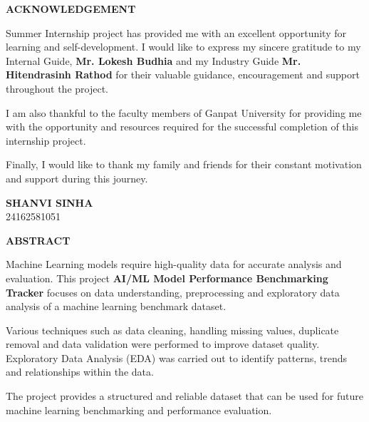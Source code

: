 \documentclass[12pt,a4paper]{report}
\begin{document}

\begin{center}
\textbf{\Large ACKNOWLEDGEMENT}
\end{center}

\vspace{1cm}

Summer Internship project has provided me with an excellent opportunity for learning and self-development. I would like to express my sincere gratitude to my Internal Guide, \textbf{Mr. Lokesh Budhia} and my Industry Guide \textbf{Mr. Hitendrasinh Rathod} for their valuable guidance, encouragement and support throughout the project.

I am also thankful to the faculty members of Ganpat University for providing me with the opportunity and resources required for the successful completion of this internship project.

Finally, I would like to thank my family and friends for their constant motivation and support during this journey.

\vspace{1cm}

\begin{flushleft}
\textbf{SHANVI SINHA}\\
24162581051
\end{flushleft}

\newpage


\begin{center}
\textbf{\Large ABSTRACT}
\end{center}

\vspace{1cm}

Machine Learning models require high-quality data for accurate analysis and evaluation. This project \textbf{AI/ML Model Performance Benchmarking Tracker} focuses on data understanding, preprocessing and exploratory data analysis of a machine learning benchmark dataset.

Various techniques such as data cleaning, handling missing values, duplicate removal and data validation were performed to improve dataset quality. Exploratory Data Analysis (EDA) was carried out to identify patterns, trends and relationships within the data.

The project provides a structured and reliable dataset that can be used for future machine learning benchmarking and performance evaluation.
\end{document}
